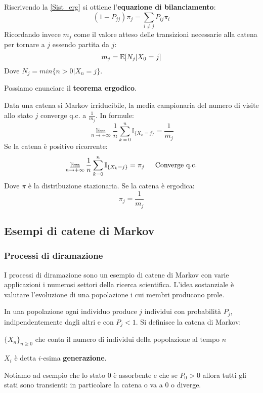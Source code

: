 Riscrivendo la \ref{Sist_erg} si ottiene l'\textbf{equazione di bilanciamento}:
\begin{equation} \label{Eq_bil}
    (1-P_{jj})\pi_j=\sum_{i\neq j}P_{ij}\pi_i
\end{equation}
Ricordando invece $m_j$ come il valore atteso delle transizioni necessarie alla catena per tornare a $j$ essendo partita da $j$:
\begin{equation}
    m_j=\mathbb{E}[N_j|X_0=j]
\end{equation}
Dove $N_j=min\{n>0|X_n=j\}$.

Possiamo enunciare il \textbf{teorema ergodico}. %
\begin{theorem}
Data una catena si Markov irriducibile, la media campionaria del numero di visite allo stato $j$ converge q.c. a $\frac{1}{m_j}$. In formule:
\[\lim_{n\to+\infty}\frac{1}{n}\sum_{k=0}^n\mathbb{I}_{\{X_k=j\}}=\frac{1}{m_j}\]
Se la catena è positivo ricorrente:
\[\lim_{n\to+\infty}\frac{1}{n}\sum_{k=0}^n\mathbb{I}_{\{X_k=j\}}=\pi_j \hspace{15px} \text{Converge q.c.}\]
Dove $\pi$ è la distribuzione stazionaria. Se la catena è ergodica:
\[\pi_j=\frac{1}{m_j}\]
\end{theorem}
\newpage

\subsection{Esempi di catene di Markov}

\subsubsection{Processi di diramazione}
I processi di diramazione sono un esempio di catene di Markov con varie applicazioni i numerosi settori della ricerca scientifica. L'idea sostanziale è valutare l'evoluzione di una popolazione i cui membri producono prole.

In una popolazione ogni individuo produce $j$ individui con probabilità $P_j$, indipendentemente dagli altri e con $P_j<1$. Si definisce la catena di Markov:
\begin{center}
    $\{X_n\}_{n\geq0}$ che conta il numero di individui della popolazione al tempo $n$
\end{center}
$X_i$ è detta $i$-esima \textbf{generazione}. 

Notiamo ad esempio che lo stato $0$ è assorbente e che se $P_0>0$ allora tutti gli stati sono transienti: in particolare la catena o va a $0$ o diverge.


